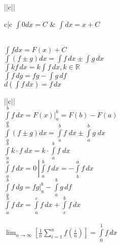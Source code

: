 \begin{tabu}[t]{||c||}
	\hline
		 \\
	\hline
	\hline
		\begin{tabu}[t]{c|c}
		$ \int 0 dx = C $ & 
		$ \int dx = x + C $ 
		\end{tabu} \\
	\hline
		$ \int f dx = F(x) + C $ \\
	\hline
		$ \int (f\pm g) dx = \int f\,dx \pm \int g\,dx $ \\
	\hline
		$ \int kf\,dx = k \int f\,dx, k \in \mathbb{R} $ \\
	\hline
		$ \int f\,dg = fg - \int g\,df $ \\
	\hline
		$ d\left(\int f\,dx \right) = f\,dx $ \\
	\hline
\end{tabu}

\begin{tabu}[t]{||c||}
	\hline
		 \\
	\hline
	\hline
		$ \int\limits_a^b f\,dx = F(x)\Bigr|_a^b = F(b) - F(a) $ \\
	\hline
		$ \int\limits_a^b (f\pm g)dx = \int\limits_a^b f\;dx \pm \int\limits_a^b g\;dx  $ \\
	\hline
		$ \int\limits_a^b k\cdot f\;dx = k\cdot\int\limits_a^b f\;dx $ \\
	\hline
		$ \left. \int\limits_a^a f\,dx = 0\, \right| \int\limits_a^b f\,dx = -\int\limits_b^a f\,dx $ \\
	\hline
		$ \int\limits_a^b f\,dg = fg\Bigr|_a^b - \int\limits_a^b g\,df $ \\
	\hline
		$ \int\limits_a^b f\,dx = \int\limits_a^c f\,dx + \int\limits_c^b f\,dx$ \\
	\hline
		 \\
	\hline
		$\displaystyle \lim_{n \to \infty} \left[ \frac{1}{n} \sum_{i = 1}^{n} f\left(\frac{i}{n}\right) \right] = \int\limits_0^1 f\,dx $ \\
	\hline
		 \\
	\hline
\end{tabu}

